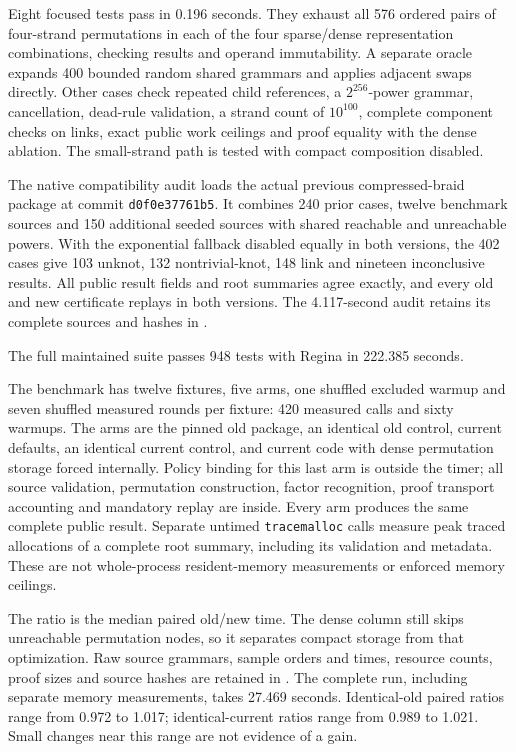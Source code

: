 Eight focused tests pass in 0.196 seconds. They exhaust all 576 ordered pairs
of four-strand permutations in each of the four sparse/dense representation
combinations, checking results and operand immutability. A separate oracle
expands 400 bounded random shared grammars and applies adjacent swaps directly.
Other cases check repeated child references, a $2^{256}$-power grammar,
cancellation, dead-rule validation, a strand count of $10^{100}$, complete
component checks on links, exact public work ceilings and proof equality with
the dense ablation. The small-strand path is tested with compact composition
disabled.

The native compatibility audit loads the actual previous compressed-braid
package at commit \texttt{d0f0e37761b5}. It combines 240 prior cases, twelve
benchmark sources and 150 additional seeded sources with shared reachable
and unreachable powers. With the exponential fallback disabled equally in
both versions, the 402 cases give 103 unknot, 132 nontrivial-knot, 148 link
and nineteen inconclusive results. All public result fields and root summaries
agree exactly, and every old and new certificate replays in both versions.
The 4.117-second audit retains its complete sources and hashes in
.

The full maintained suite passes 948 tests with Regina in 222.385 seconds.

The benchmark has twelve fixtures, five arms, one shuffled excluded warmup
and seven shuffled measured rounds per fixture: 420 measured calls and sixty
warmups. The arms are the pinned old package, an identical old control,
current defaults, an identical current control, and current code with dense
permutation storage forced internally. Policy binding for this last arm is
outside the timer; all source validation, permutation construction, factor
recognition, proof transport accounting and mandatory replay are inside.
Every arm produces the same complete public result. Separate untimed
\texttt{tracemalloc} calls measure peak traced allocations of a complete root
summary, including its validation and metadata. These are not whole-process
resident-memory measurements or enforced memory ceilings.



The ratio is the median paired old/new time. The dense column still skips
unreachable permutation nodes, so it separates compact storage from that
optimization. Raw source grammars, sample orders and times, resource counts,
proof sizes and source hashes are retained in
. The complete run,
including separate memory measurements, takes 27.469 seconds. Identical-old
paired ratios range from 0.972 to 1.017; identical-current ratios range from
0.989 to 1.021. Small changes near this range are not evidence of a gain.

